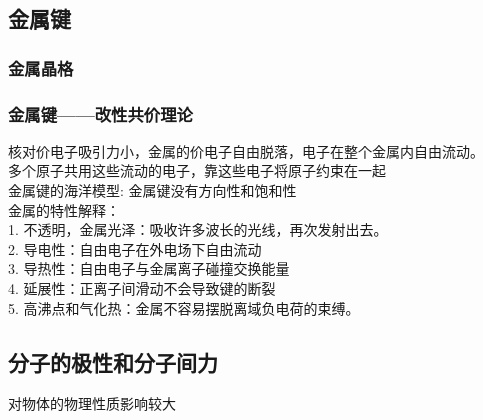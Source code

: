 \documentclass[utf8,a4paper,12pt]{ctexart}
\begin{document}
\subsection{金属键}
\subsubsection{金属晶格}
\subsubsection{金属键——改性共价理论}
核对价电子吸引力小，金属的价电子自由脱落，电子在整个金属内自由流动。\\
多个原子共用这些流动的电子，靠这些电子将原子约束在一起\\
金属键的海洋模型: 金属键没有方向性和饱和性\\
金属的特性解释：\\
1. 不透明，金属光泽：吸收许多波长的光线，再次发射出去。\\
2. 导电性：自由电子在外电场下自由流动\\
3. 导热性：自由电子与金属离子碰撞交换能量\\
4. 延展性：正离子间滑动不会导致键的断裂\\
5. 高沸点和气化热：金属不容易摆脱离域负电荷的束缚。
\subsection{分子的极性和分子间力}
对物体的物理性质影响较大
\end{document}
